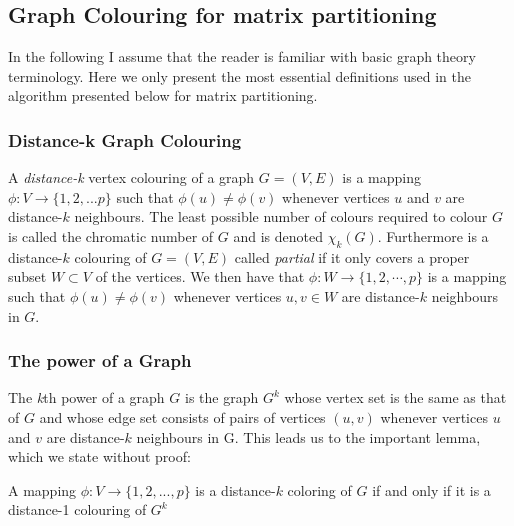 \subsection{Graph Colouring for matrix partitioning}
In the following I assume that the reader is familiar with basic graph theory terminology. 
Here we only present the most essential definitions used in the algorithm presented below for matrix partitioning.

\subsubsection*{Distance-k Graph Colouring}
\begin{definition}
A \textit{distance-k} vertex colouring of a graph $G = (V,E)$ is a mapping $\phi : V \to \{1,2,...p\}$ such that $\phi(u) \not= \phi(v)$ whenever vertices $u$ and $v$ are distance-$k$ neighbours. The least possible number of colours required to colour $G$ is called the chromatic number of $G$ and is denoted $\chi_k(G)$. Furthermore is a distance-$k$ colouring of $G = (V,E)$ called \emph{partial} if it only covers a proper subset $W \subset V$ of the vertices. We then have that $\phi: W \to \{1,2, \cdots, p\}$ is a mapping such that  $\phi(u) \not= \phi(v)$ whenever vertices $u, v \in W$ are distance-$k$ neighbours in $G$.  
\end{definition}

\subsubsection*{The power of a Graph}
\begin{definition}
The \emph{k}th power of a graph $G$ is the graph $G^k$ whose vertex set is the same as that of $G$ and whose edge set consists of pairs of vertices $(u,v)$ whenever vertices $u$ and $v$ are distance-$k$ neighbours in G. 
This leads us to the important lemma, which we state without proof:
\end{definition}
\begin{lemma}
A mapping $\phi : V \to \{1,2,..., p\}$ is a distance-$k$ coloring of $G$ if and only if it is a distance-1 colouring of $G^k$
\end{lemma}

